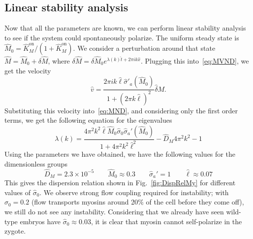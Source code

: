 \documentclass[11pt]{article}
\newcommand{\6}[1]{#1_{\text{6}}}
\newcommand{\3}[1]{#1_{\text{3}}}
\begin{document}
\subsection{Linear stability analysis \label{sec:StabMy}}
Now that all the parameters are known, we can perform linear stability analysis to see if the system could spontaneously polarize. The uniform steady state is $\hat{M}_0= \hat{K}^\text{on}_M/\left(1+\hat{K}^\text{on}_M\right)$. We consider a perturbation around that state $\hat M=\hat{M}_0+\delta \hat M$, where $\delta \hat M = \delta \hat M_0 e^{\lambda(k) \hat{t}+2 \pi i k \hat{x}}$. Plugging this into\ \eqref{eq:MVND}, we get the velocity \cite[Eq.~(11)]{bois2011pattern}
\begin{equation}
\hat v = \frac{2 \pi i k \hat{\ell} \hat{\sigma}'_a(\hat M_0)}{1 + \left(2 \pi k \hat \ell\right)^2} \hat \delta M. 
\end{equation}
Substituting this velocity into\ \eqref{eq:MND}, and considering only the first order terms, we get the following equation for the eigenvalues
\begin{equation}
\label{eq:DispRel}
\lambda(k) = \frac{4\pi^2 k^2 \hat{\ell} \hat{M}_0 \hat{\sigma}_0 \hat \sigma_a'(\hat{M}_0)}{1+4\pi^2 k^2 \hat{\ell}^2} - \hat{D}_M 4 \pi^2 k^2 -1
\end{equation}
Using the parameters we have obtained, we have the following values for the dimensionless groups
\begin{equation}
\hat{D}_M = 2.3 \times 10^{-5} \qquad \hat{M}_0 \approx 0.3 \qquad \hat \sigma_a'=1 \qquad \hat{\ell} \approx 0.07
\end{equation}
This gives the dispersion relation shown in Fig.\ \ref{fig:DispRelMy} for different values of $\hat{\sigma}_0$. We observe strong flow coupling required for instability; with $\hat{\sigma}_0=0.2$ (flow transports myosins around 20\% of the cell before they come off), we still do not see any instability. Considering that we already have seen wild-type embryos have $\hat \sigma_0 \approx 0.03$, it is clear that myosin cannot self-polarize in the zygote.
\end{document}
